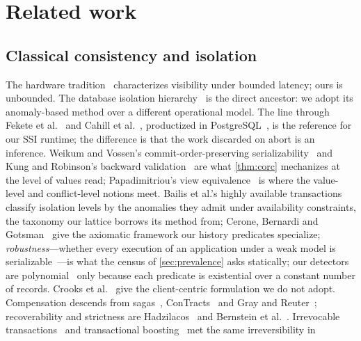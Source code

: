 \section{Related work}
\label{sec:related}

\subsection{Classical consistency and isolation}
The hardware tradition~\cite{Lamport1979SC,GharachorlooEtAl1990,PulteEtAl2018ARMv8,HerlihyWing1990}
characterizes visibility under bounded latency; ours is unbounded. The
database isolation
hierarchy~\cite{BerensonEtAl1995,Adya1999,AdyaLiskovOneil2000} is the direct
ancestor: we adopt its anomaly-based method over a different operational
model. The line through Fekete et al.~\cite{FeketeEtAl2005MakingSI} and
Cahill et al.~\cite{CahillRohmFekete2008SSI}, productized in
PostgreSQL~\cite{PortsGrittner2012}, is the reference for our SSI runtime; the
difference is that the work discarded on abort is an inference. Weikum and
Vossen's commit-order-preserving serializability~\cite{WeikumVossen2001} and
Kung and Robinson's backward validation~\cite{KungRobinson1981OCC} are what
\cref{thm:corc} mechanizes at the level of values read; Papadimitriou's view
equivalence~\cite{Papadimitriou1979} is where the value-level and
conflict-level notions meet. Bailis et al.'s highly available
transactions~\cite{BailisEtAl2014HAT} classify isolation levels by the
anomalies they admit under availability constraints, the taxonomy our lattice
borrows its method from; Cerone, Bernardi and
Gotsman~\cite{CeroneEtAl2015Framework} give the axiomatic framework our
history predicates specialize; \emph{robustness}---whether every execution of
an application under a weak model is
serializable~\cite{BernardiGotsman2016Robustness,BeillahiEtAl2019RobustnessSI}---is
what the census of \cref{sec:prevalence} asks statically; our detectors
are polynomial~\cite{BiswasEnea2019Complexity} only because each predicate is
existential over a constant number of records. Crooks et
al.~\cite{CrooksEtAl2017Seeing} give the client-centric formulation we do
not adopt. Compensation descends from
sagas~\cite{GarciaMolinaSalem1987Sagas}, ConTracts~\cite{ReuterWachter1991ConTract}
and Gray and Reuter~\cite{GrayReuter1993}; recoverability and strictness
are Hadzilacos~\cite{Hadzilacos1988Reliability} and Bernstein et
al.~\cite{BernsteinHadzilacosGoodman1987}. Irrevocable transactions~\cite{WelcEtAl2008Irrevocable} and transactional
boosting~\cite{HerlihyKoskinen2008Boosting} met the same irreversibility in
